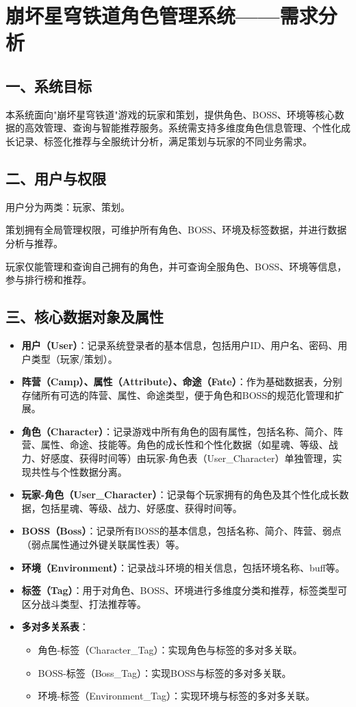 \documentclass{ctexart}
\begin{document}
\section{崩坏星穹铁道角色管理系统——需求分析}

\subsection{一、系统目标}
本系统面向"崩坏星穹铁道"游戏的玩家和策划，提供角色、BOSS、环境等核心数据的高效管理、查询与智能推荐服务。系统需支持多维度角色信息管理、个性化成长记录、标签化推荐与全服统计分析，满足策划与玩家的不同业务需求。

\subsection{二、用户与权限}
用户分为两类：玩家、策划。

策划拥有全局管理权限，可维护所有角色、BOSS、环境及标签数据，并进行数据分析与推荐。

玩家仅能管理和查询自己拥有的角色，并可查询全服角色、BOSS、环境等信息，参与排行榜和推荐。

\subsection{三、核心数据对象及属性}
\begin{itemize}
  \item \textbf{用户（User）}：记录系统登录者的基本信息，包括用户ID、用户名、密码、用户类型（玩家/策划）。
  \item \textbf{阵营（Camp）、属性（Attribute）、命途（Fate）}：作为基础数据表，分别存储所有可选的阵营、属性、命途类型，便于角色和BOSS的规范化管理和扩展。
  \item \textbf{角色（Character）}：记录游戏中所有角色的固有属性，包括名称、简介、阵营、属性、命途、技能等。角色的成长性和个性化数据（如星魂、等级、战力、好感度、获得时间等）由玩家-角色表（User\_Character）单独管理，实现共性与个性数据分离。
  \item \textbf{玩家-角色（User\_Character）}：记录每个玩家拥有的角色及其个性化成长数据，包括星魂、等级、战力、好感度、获得时间等。
  \item \textbf{BOSS（Boss）}：记录所有BOSS的基本信息，包括名称、简介、阵营、弱点（弱点属性通过外键关联属性表）等。
  \item \textbf{环境（Environment）}：记录战斗环境的相关信息，包括环境名称、buff等。
  \item \textbf{标签（Tag）}：用于对角色、BOSS、环境进行多维度分类和推荐，标签类型可区分战斗类型、打法推荐等。
  \item \textbf{多对多关系表}：
    \begin{itemize}
      \item 角色-标签（Character\_Tag）：实现角色与标签的多对多关联。
      \item BOSS-标签（Boss\_Tag）：实现BOSS与标签的多对多关联。
      \item 环境-标签（Environment\_Tag）：实现环境与标签的多对多关联。
    \end{itemize}
\end{itemize}
\end{document}

